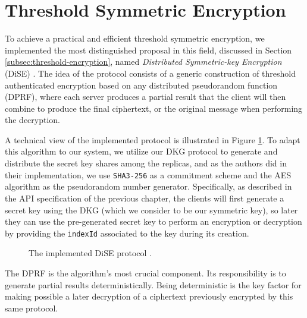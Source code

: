 \section{Threshold Symmetric Encryption} \label{sec:thresholdencryption}

To achieve a practical and efficient threshold symmetric encryption, we implemented the most distinguished proposal in this field, discussed in Section \ref{subsec:threshold-encryption}, named \textit{Distributed Symmetric-key Encryption} (DiSE) \cite{dise}. The idea of the protocol consists of a generic construction of threshold authenticated encryption based on any distributed pseudorandom function (DPRF), where each server produces a partial result that the client will then combine to produce the final ciphertext, or the original message when performing the decryption. 

A technical view of the implemented protocol is illustrated in Figure \ref{fig:5.3.dise-protocol}. To adapt this algorithm to our system, we utilize our DKG protocol to generate and distribute the secret key shares among the replicas, and as the authors did in their implementation, we use \texttt{SHA3-256} as a commitment scheme and the AES algorithm as the pseudorandom number generator. Specifically, as described in the API specification of the previous chapter, the clients will first generate a secret key using the DKG (which we consider to be our symmetric key), so later they can use the pre-generated secret key to perform an encryption or decryption by providing the \texttt{indexId} associated to the key during its creation.

\begin{figure}[h]
    \begin{center}
    \end{center}
    \caption{The implemented DiSE protocol \cite{dise}.}
    \label{fig:5.3.dise-protocol}
\end{figure}

The DPRF is the algorithm's most crucial component. Its responsibility is to generate partial results deterministically. Being deterministic is the key factor for making possible a later decryption of a ciphertext previously encrypted by this same protocol.

